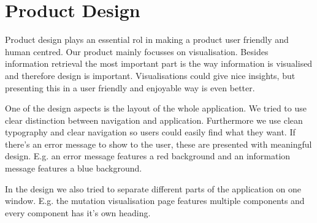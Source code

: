 \section{Product Design}
	Product design plays an essential rol in making	a product user friendly and human centred. Our product mainly focusses on visualisation. Besides information retrieval the most important part is the way information is visualised and therefore design is important. Visualisations could give nice insights, but presenting this in a user friendly and enjoyable way is even better.
	
	One of the design aspects is the layout of the whole application. We tried to use clear distinction between navigation and application. Furthermore we use clean typography and clear navigation so users could easily find what they want. If there's an error message to show to the user, these are presented with meaningful design. E.g. an error message features a red background and an information message features a blue background.
	
	In the design we also tried to separate different parts of the application on one window. E.g. the mutation visualisation page features multiple components and every component has it's own heading.